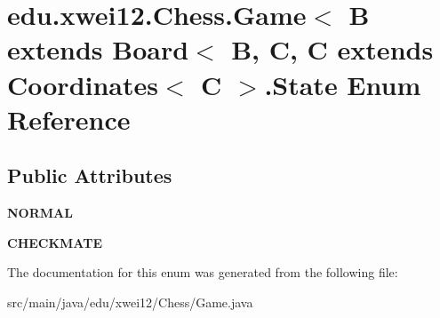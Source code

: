 \hypertarget{enumedu_1_1xwei12_1_1_chess_1_1_game_1_1_state}{}\section{edu.\+xwei12.\+Chess.\+Game$<$ B extends Board$<$ B, C, C extends Coordinates$<$ C $>$.State Enum Reference}
\label{enumedu_1_1xwei12_1_1_chess_1_1_game_1_1_state}
\subsection*{Public Attributes}
\begin{DoxyCompactItemize}
\item 
{\bfseries N\+O\+R\+M\+AL}\hypertarget{enumedu_1_1xwei12_1_1_chess_1_1_game_1_1_state_a2b63ea786a6b4d29dc034631f50f9a94}{}\label{enumedu_1_1xwei12_1_1_chess_1_1_game_1_1_state_a2b63ea786a6b4d29dc034631f50f9a94}

\item 
{\bfseries C\+H\+E\+C\+K\+M\+A\+TE}\hypertarget{enumedu_1_1xwei12_1_1_chess_1_1_game_1_1_state_ab1bcff691625945a754d905c419e72d6}{}\label{enumedu_1_1xwei12_1_1_chess_1_1_game_1_1_state_ab1bcff691625945a754d905c419e72d6}

\end{DoxyCompactItemize}


The documentation for this enum was generated from the following file\+:\begin{DoxyCompactItemize}
\item 
src/main/java/edu/xwei12/\+Chess/Game.\+java\end{DoxyCompactItemize}
